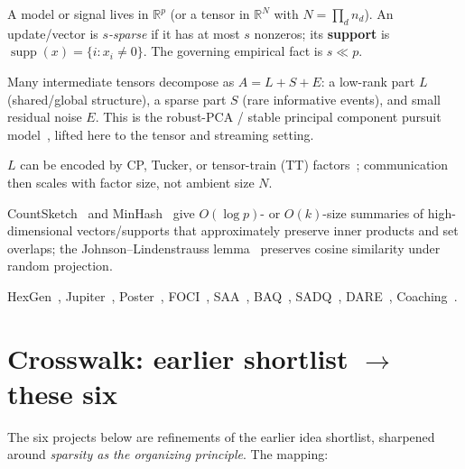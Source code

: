 \documentclass[11pt]{article}
\newcommand{\supp}{\operatorname{supp}}
\newcommand{\R}{\mathbb{R}}
\newcommand{\term}[1]{\textbf{\color{accent!85!black}#1}}
\begin{document}
\begin{description}[leftmargin=0pt,style=nextline,itemsep=2pt]
\item[Dimension and sparsity] A model or signal lives in $\R^{p}$ (or a tensor in $\R^{N}$
with $N=\prod_d n_d$). An update/vector is \emph{$s$-sparse} if it has at most $s$ nonzeros;
its \term{support} is $\supp(x)=\{i:x_i\neq0\}$. The governing empirical fact is $s\ll p$.
\item[Low-rank-plus-sparse] Many intermediate tensors decompose as $A=L+S+E$: a low-rank
part $L$ (shared/global structure), a sparse part $S$ (rare informative events), and small
residual noise $E$. This is the robust-PCA / stable principal component pursuit
model~\cite{rpca}, lifted here to the tensor and streaming setting.
\item[Tensor factorizations] $L$ can be encoded by CP, Tucker, or tensor-train (TT)
factors~\cite{kolda,tt}; communication then scales with factor size, not ambient size $N$.
\item[Sketches] CountSketch~\cite{countsketch} and MinHash~\cite{minhash} give $O(\log p)$-
or $O(k)$-size summaries of high-dimensional vectors/supports that approximately preserve
inner products and set overlaps; the Johnson--Lindenstrauss lemma~\cite{jl} preserves
cosine similarity under random projection.
\item[Reference short-names] HexGen~\cite{hexgen}, Jupiter~\cite{jupiter}, Poster~\cite{poster},
FOCI~\cite{foci}, SAA~\cite{saa}, BAQ~\cite{baq}, SADQ~\cite{sadq}, DARE~\cite{dare},
Coaching~\cite{coaching}.
\end{description}

\section{Crosswalk: earlier shortlist \texorpdfstring{$\rightarrow$}{->} these six}
\label{sec:crosswalk}

The six projects below are refinements of the earlier idea shortlist, sharpened around
\emph{sparsity as the organizing principle}. The mapping:
\end{document}
